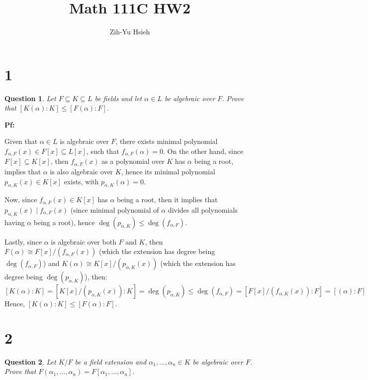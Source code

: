 \documentclass{article}
\title{Math 111C HW2}
\author{Zih-Yu Hsieh}
\newtheorem{question}{Question}
\begin{document}
\maketitle

\section*{1}
\begin{myBox}[]{}
    \begin{question}
        Let $F\subseteq K\subseteq L$ be fields and let $\alpha\in L$ be algebraic over $F$. Prove that $[K(\alpha):K]\leq [F(\alpha):F]$.
    \end{question}
\end{myBox}

\textbf{Pf:}

Given that $\alpha\in L$ is algebraic over $F$, there exists minimal polynomial $f_{\alpha,F}(x)\in F[x]\subseteq L[x]$, such that $f_{\alpha, F}(\alpha)=0$.
On the other hand, since $F[x]\subseteq K[x]$, then $f_{\alpha, F}(x)$ as a polynomial over $K$ has $\alpha$ being a root, implies that $\alpha$ is also algebraic over $K$,
hence its minimal polynomial $p_{\alpha, K}(x)\in K[x]$ exists, with $p_{\alpha,K}(\alpha)=0$.

Now, since $f_{\alpha,F}(x)\in K[x]$ has $\alpha$ being a root, then it implies that $p_{\alpha,K}(x)\mid f_{\alpha,F}(x)$ (since minimal polynomial of $\alpha$ divides all polynomials having $\alpha$ being a root),
hence $\deg(p_{\alpha,K})\leq \deg(f_{\alpha,F})$.

Lastly, since $\alpha$ is algebraic over both $F$ and $K$, then $F(\alpha)\cong F[x]/(f_{\alpha,F}(x))$ (which the extension has degree being $\deg(f_{\alpha,F})$) and $K(\alpha)\cong K[x]/(p_{\alpha,K}(x))$ (which the extension has degree being $\deg(p_{\alpha,K})$),
then:
$$[K(\alpha):K]=[K[x]/(p_{\alpha,K}(x)):K]=\deg(p_{\alpha,K})\leq\deg(f_{\alpha,F})=[F[x]/(f_{\alpha,K}(x)):F]=[(\alpha):F]$$
Hence, $[K(\alpha):K]\leq [F(\alpha):F]$.


\break

\section*{2}
\begin{myBox}[]{}
    \begin{question}
        Let $K/F$ be a field extension and $\alpha_1,...,\alpha_n\in K$ be algebraic over $F$. Prove that $F(\alpha_1,...,\alpha_n)=F[\alpha_1,...,\alpha_n]$.
    \end{question}
\end{myBox}
\end{document}
